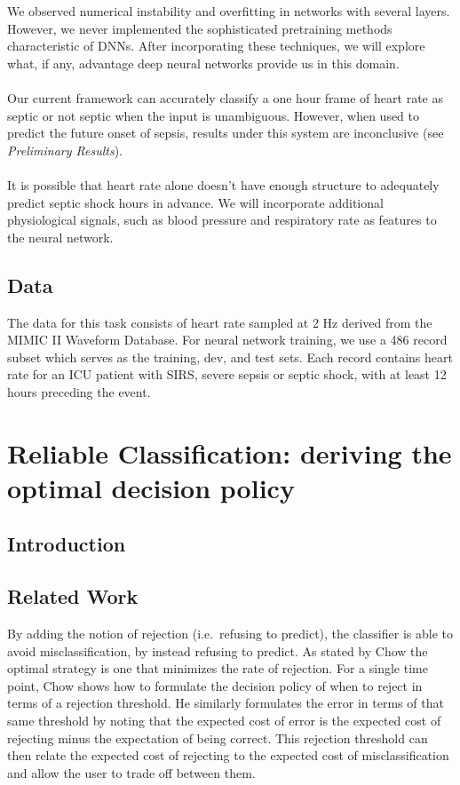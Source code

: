 \documentclass[12pt,solutions]{article}
\begin{document}
We observed numerical instability and overfitting in networks with several layers. However, we never implemented the sophisticated pretraining
methods characteristic of DNNs. After incorporating these techniques, we will explore what, if any, advantage deep neural networks provide
us in this domain.
\\
\\
Our current framework can accurately classify a one hour frame of heart rate as septic or not septic when the input is unambiguous. However,
when used to predict the future onset of sepsis, results under this system are inconclusive (see \textit{Preliminary Results}).
\\
\\
It is possible that heart rate alone doesn't have enough structure to adequately predict septic shock hours in advance. We will incorporate
additional physiological signals, such as blood pressure and respiratory rate as features to the neural network.

\subsection{Data}

The data for this task consists of heart rate sampled at 2 Hz derived from the MIMIC II Waveform Database. For neural network training, we use a 486 record subset which 
serves as the training, dev, and test sets. 
Each record contains heart rate for an ICU patient with SIRS, severe sepsis or septic shock, with at least
12 hours preceding the event.

\section{Reliable Classification: deriving the optimal decision policy}

\subsection{Introduction}


\subsection{Related Work}

By adding the notion of rejection (i.e.\  refusing to predict), the classifier is able to avoid misclassification, by instead refusing to predict. As stated by Chow \cite{Chow1970} the optimal strategy is one that minimizes the rate of rejection. For a single time point, Chow shows how to formulate the decision policy of when to reject in terms of a rejection threshold. He similarly formulates the error in terms of that same threshold by noting that the expected cost of error is the expected cost of rejecting minus the expectation of being correct. This rejection threshold can then relate the expected cost of rejecting to the expected cost of misclassification and allow the user to trade off between them. 
\end{document}

